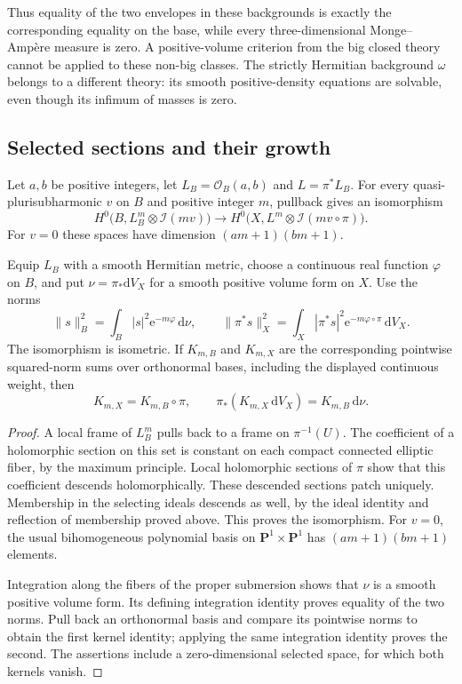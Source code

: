 Thus equality of the two envelopes in these backgrounds is exactly the corresponding equality on the base, while every three-dimensional Monge--Amp\`ere measure is zero. A positive-volume criterion from the big closed theory cannot be applied to these non-big classes. The strictly Hermitian background $\omega$ belongs to a different theory: its smooth positive-density equations are solvable, even though its infimum of masses is zero.

\subsection{Selected sections and their growth}

\begin{proposition}\label{prop:elliptic-selected-section-descent}
Let $a,b$ be positive integers, let $L_B=\mathcal O_B(a,b)$ and $L=\pi^*L_B$. For every quasi-plurisubharmonic $v$ on $B$ and positive integer $m$, pullback gives an isomorphism
\[
 H^0\bigl(B,L_B^m\otimes\mathcal I(mv)\bigr)
   \longrightarrow
 H^0\bigl(X,L^m\otimes\mathcal I(mv\circ\pi)\bigr).
\]
For $v=0$ these spaces have dimension $(am+1)(bm+1)$.

Equip $L_B$ with a smooth Hermitian metric, choose a continuous real function $\varphi$ on $B$, and put $\nu=\pi_*\mathrm{d}V_X$ for a smooth positive volume form on $X$. Use the norms
\[
 \|s\|_B^2=\int_B|s|^2\mathrm{e}^{-m\varphi}\,\mathrm{d}\nu,
 \qquad
 \|\pi^*s\|_X^2=\int_X|\pi^*s|^2
                \mathrm{e}^{-m\varphi\circ\pi}\,\mathrm{d}V_X.
\]
The isomorphism is isometric. If $K_{m,B}$ and $K_{m,X}$ are the corresponding pointwise squared-norm sums over orthonormal bases, including the displayed continuous weight, then
\[
 K_{m,X}=K_{m,B}\circ\pi,
 \qquad \pi_*(K_{m,X}\,\mathrm{d}V_X)=K_{m,B}\,\mathrm{d}\nu.
\]
\end{proposition}
\begin{proof}
A local frame of $L_B^m$ pulls back to a frame on $\pi^{-1}(U)$. The coefficient of a holomorphic section on this set is constant on each compact connected elliptic fiber, by the maximum principle. Local holomorphic sections of $\pi$ show that this coefficient descends holomorphically. These descended sections patch uniquely. Membership in the selecting ideals descends as well, by the ideal identity and reflection of membership proved above. This proves the isomorphism. For $v=0$, the usual bihomogeneous polynomial basis on $\mathbf P^1\times\mathbf P^1$ has $(am+1)(bm+1)$ elements.

Integration along the fibers of the proper submersion shows that $\nu$ is a smooth positive volume form. Its defining integration identity proves equality of the two norms. Pull back an orthonormal basis and compare its pointwise norms to obtain the first kernel identity; applying the same integration identity proves the second. The assertions include a zero-dimensional selected space, for which both kernels vanish.
\end{proof}

